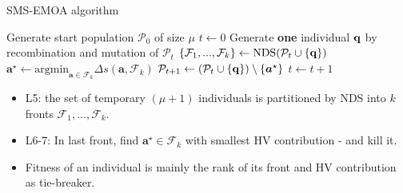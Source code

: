 \begin{frame}[allowframebreaks]{SMS-EMOA algorithm}
\begin{algorithm}[H]
  \begin{center}
  \caption{SMS-EMOA}
    \begin{algorithmic}[1]
    \STATE Generate start population $\mathcal{P}_0$ of size $\mu$
    \STATE $t \leftarrow 0$
      \REPEAT
        \STATE Generate \textbf{one} individual $\mathbf{q}$ by recombination and mutation of $\mathcal{P}_t$ 
        \STATE $\{\mathcal{F}_{1},..., \mathcal{F}_k\} \leftarrow \text{NDS}(\mathcal{P}_{t}\cup \{\mathbf{q}\})$
        \STATE $\bm{a}^\star \leftarrow \text{argmin}_{\bm{a} \in \mathcal{F}_{k}}\Delta s(\bm{a}, \mathcal{F}_{k})$
        \STATE $\mathcal{P}_{t+1} \leftarrow (\mathcal{P}_t \cup \{\mathbf{q}\}) \setminus\{\bm{a}^\star\}$
        \STATE $ t \leftarrow t+1$
    \vspace*{-0.3cm}
    \end{algorithmic}
    \end{center}
\end{algorithm}
    \vspace{-0.5cm}
\begin{itemize}
\item L5: the set of temporary $(\mu + 1)$ individuals is partitioned by NDS into $k$ fronts $\mathcal{F}_{1},...,\mathcal{F}_{k}$. 
\item L6-7: In last front, find $\bm{a}^\star \in \mathcal{F}_{k}$ with smallest HV contribution - and kill it.
\item Fitness of an individual is mainly the rank of its front and HV contribution as tie-breaker.
\end{itemize}
\end{frame}


